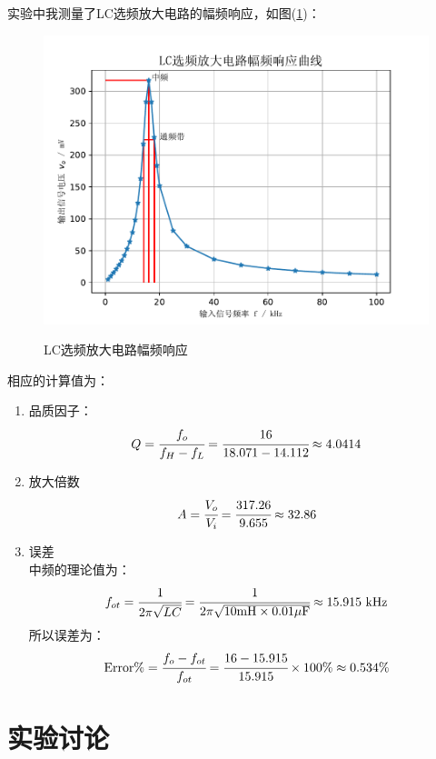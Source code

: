 \documentclass[a4paper]{article}
\begin{document}
实验中我测量了LC选频放大电路的幅频响应，如图(\ref{AFCfig})：
\begin{figure}[!h]
\centering
\includegraphics[width=12cm]{fig/AFC.pdf}\\
\caption{LC选频放大电路幅频响应}\label{AFCfig}
\end{figure}

相应的计算值为：
\begin{enumerate}
\item 品质因子：\\
\begin{equation}
Q = \cfrac{f_o}{f_H - f_L} = \cfrac{16}{18.071 - 14.112} \approx 4.0414\label{Q}
\end{equation}
\item 放大倍数\\
\begin{equation}
A = \cfrac{V_o}{V_i} = \cfrac{317.26}{9.655} \approx 32.86\label{A_V}
\end{equation}
\item 误差\\
中频的理论值为：
\begin{equation}
f_{ot} = \cfrac{1}{2\pi\sqrt{LC}} = \cfrac{1}{2\pi\sqrt{10\text{mH}\times 0.01\mu \text{F}}} \approx 15.915\text{ kHz}\label{fo_theory}
\end{equation}
所以误差为：
\begin{equation}
\text{Error\%} = \cfrac{f_o - f_{ot}}{f_{ot}} = \cfrac{16-15.915}{15.915}\times 100\% \approx 0.534\%\label{Error}
\end{equation}
\end{enumerate}

\section{实验讨论}
\end{document}
